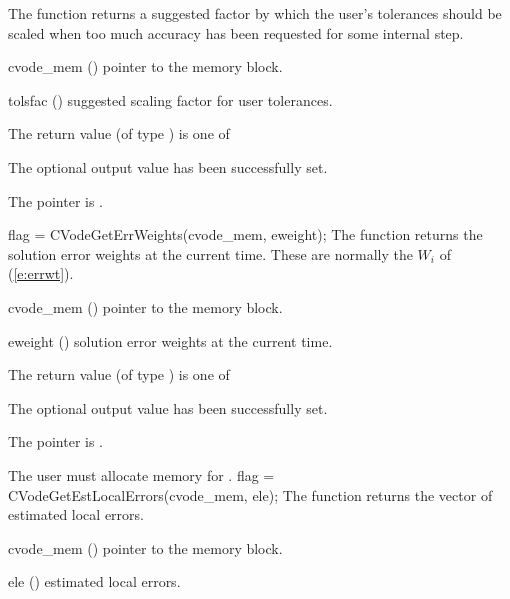 {
  The function  returns a
  suggested factor by which the user's tolerances 
  should be scaled when too much accuracy has been 
  requested for some internal step.
}
{
  \begin{args}
  \item[cvode\_mem] ()
    pointer to the {\cvode} memory block.
  \item[tolsfac] ()
    suggested scaling factor for user tolerances.
  \end{args}
}
{
  The return value  (of type ) is one of
  \begin{args}
  \item[\Id{CV\_SUCCESS}] 
    The optional output value has been successfully set.
  \item[\Id{CV\_MEM\_NULL}]
    The  pointer is .
  \end{args}
}
{}
{
  flag = CVodeGetErrWeights(cvode\_mem, eweight);
}
{
  The function  returns the solution error weights 
  at the current time. These are normally the $W_i$ of (\ref{e:errwt}).
}
{
  \begin{args}
  \item[cvode\_mem] ()
    pointer to the {\cvode} memory block.
  \item[eweight] ()
    solution error weights at the current time.
  \end{args}
}
{
  The return value  (of type ) is one of
  \begin{args}
  \item[\Id{CV\_SUCCESS}] 
    The optional output value has been successfully set.
  \item[\Id{CV\_MEM\_NULL}]
    The  pointer is .
  \end{args}
}
{
  {\warn}The user must allocate memory for .
}
{
  flag = CVodeGetEstLocalErrors(cvode\_mem, ele);
}
{
  The function  returns the
  vector of estimated local errors.
}
{
  \begin{args}
  \item[cvode\_mem] ()
    pointer to the {\cvode} memory block.
  \item[ele] ()
    estimated local errors.
  \end{args}
}
